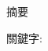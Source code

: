 

\doublespacing

%
\onehalfspacing

\begin{titlepage}
\begin{CJK}{UTF8}{bkai}
\begin{center}
\Large{{摘要}}\\
\end{center}

\vspace*{5em}

{關鍵字:} \emph{}


\end{CJK}
\end{titlepage}

%
